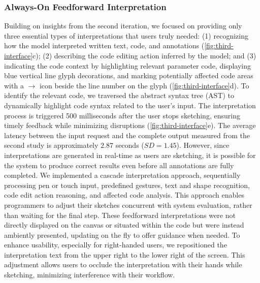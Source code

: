 \subsubsection{Always-On Feedforward Interpretation}
\label{sec:feedforward}
Building on insights from the second iteration, we focused on providing only three essential types of interpretations that users truly needed: (1) recognizing how the model interpreted written text, code, and annotations (\autoref{fig:third-interface}c); (2) describing the code editing action inferred by the model; and (3) indicating the code context by highlighting relevant parameter code, displaying blue vertical line glyph decorations, and marking potentially affected code areas with a $\rightarrow$ icon beside the line number on the glyph (\autoref{fig:third-interface}d).
To identify the relevant code, we traversed the abstract syntax tree (AST) to dynamically highlight code syntax related to the user's input. The interpretation process is triggered 500 milliseconds after the user stops sketching, ensuring timely feedback while minimizing disruptions (\autoref{fig:third-interface}e).
The average latency between the input request and the complete output measured from the second study is approximately $2.87$ seconds (\(SD = 1.45\)). However, since interpretations are generated in real-time as users are sketching, it is possible for the system to produce correct results even before all annotations are fully completed.
We implemented a cascade interpretation approach, sequentially processing pen or touch input, predefined gestures, text and shape recognition, code edit action reasoning, and affected code analysis. This approach enables programmers to adjust their sketches concurrent with system evaluation, rather than waiting for the final step. 
These feedforward interpretations were not directly displayed on the canvas or situated within the code but were instead ambiently presented, updating on the fly to offer guidance when needed.
To enhance usability, especially for right-handed users, we repositioned the interpretation text from the upper right to the lower right of the screen. This adjustment allows users to occlude the interpretation with their hands while sketching, minimizing interference with their workflow.






